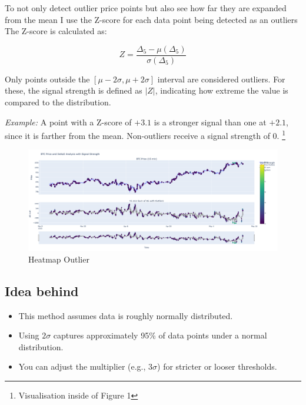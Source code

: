 \documentclass[12pt]{article}
\begin{document}
To not only detect outlier price points but also see how far they are expanded from the mean I use the Z-score for each data point being detected as an outliers
\newpage
The Z-score is calculated as:

\[
Z = \frac{\Delta_5 - \mu(\Delta_5)}{\sigma(\Delta_5)}
\]

Only points outside the $[\mu - 2\sigma, \mu + 2\sigma]$ interval are considered outliers.  
For these, the signal strength is defined as $|Z|$, indicating how extreme the value is compared to the distribution.

\textit{Example:}  
A point with a Z-score of $+3.1$ is a stronger signal than one at $+2.1$, since it is farther from the mean.  
Non-outliers receive a signal strength of 0. 
\footnote{Visualisation inside of Figure 1}





\begin{figure}
    \centering
    \includegraphics[width=1\textwidth]{imgs/outlier_signal_visualised.png}
    \caption{Heatmap Outlier}
\end{figure}




\newpage


\subsection*{Idea behind}

\begin{itemize}
    \item This method assumes data is roughly normally distributed.
    \item Using $2\sigma$ captures approximately 95\% of data points under a normal distribution.
    \item You can adjust the multiplier (e.g., $3\sigma$) for stricter or looser thresholds.
\end{itemize}
\end{document}
